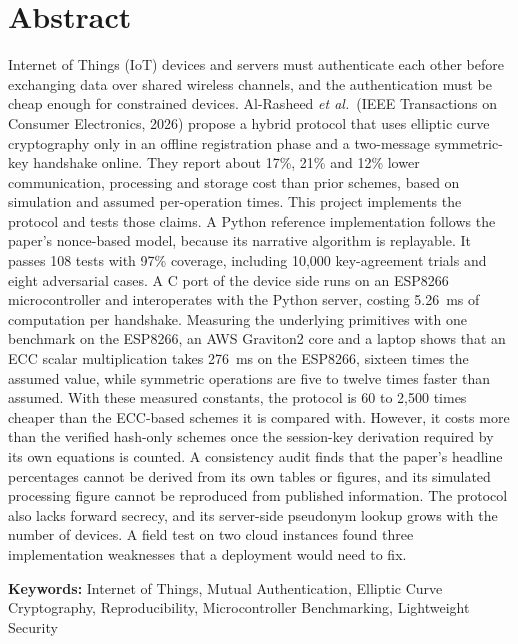 \documentclass[12pt,a4paper,oneside]{report}
\numberwithin{equation}{chapter}
\begin{document}
\chapter*{Abstract}
Internet of Things (IoT) devices and servers must authenticate each other before exchanging data over shared wireless channels, and the authentication must be cheap enough for constrained devices. Al-Rasheed \emph{et al.}\ (IEEE Transactions on Consumer Electronics, 2026) propose a hybrid protocol that uses elliptic curve cryptography only in an offline registration phase and a two-message symmetric-key handshake online. They report about 17\%, 21\% and 12\% lower communication, processing and storage cost than prior schemes, based on simulation and assumed per-operation times. This project implements the protocol and tests those claims. A Python reference implementation follows the paper's nonce-based model, because its narrative algorithm is replayable. It passes 108 tests with 97\% coverage, including 10{,}000 key-agreement trials and eight adversarial cases. A C port of the device side runs on an ESP8266 microcontroller and interoperates with the Python server, costing 5.26~ms of computation per handshake. Measuring the underlying primitives with one benchmark on the ESP8266, an AWS Graviton2 core and a laptop shows that an ECC scalar multiplication takes 276~ms on the ESP8266, sixteen times the assumed value, while symmetric operations are five to twelve times faster than assumed. With these measured constants, the protocol is 60 to 2{,}500 times cheaper than the ECC-based schemes it is compared with. However, it costs more than the verified hash-only schemes once the session-key derivation required by its own equations is counted. A consistency audit finds that the paper's headline percentages cannot be derived from its own tables or figures, and its simulated processing figure cannot be reproduced from published information. The protocol also lacks forward secrecy, and its server-side pseudonym lookup grows with the number of devices. A field test on two cloud instances found three implementation weaknesses that a deployment would need to fix.

\vspace{0.2in}
\noindent\textbf{Keywords:} Internet of Things, Mutual Authentication, Elliptic Curve Cryptography, Reproducibility, Microcontroller Benchmarking, Lightweight Security

\tableofcontents
\listoffigures
{}
\listoftables
{}
\end{document}
